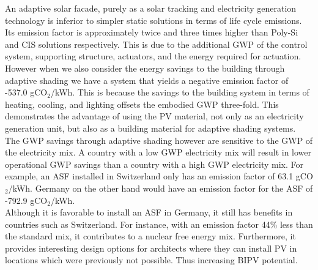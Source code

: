 
An adaptive solar facade, purely as a solar tracking and electricity generation technology is inferior to simpler static solutions in terms of life cycle emissions. Its emission factor is approximately twice and three times higher than Poly-Si and CIS solutions respectively. This is due to the additional GWP of the control system, supporting structure, actuators, and the energy required for actuation. \\

However when we also consider the energy savings to the building through adaptive shading we have a system that yields a negative emission factor of -537.0 gCO${_2}$/kWh. This is because the savings to the building system in terms of heating, cooling, and lighting offsets the embodied GWP three-fold. This demonstrates the advantage of using the PV material, not only as an electricity generation unit, but also as a building material for adaptive shading systems.\\


The GWP savings through adaptive shading however are sensitive to the GWP of the electricity mix. A country with a low GWP electricity mix will result in lower operational GWP savings than a country with a high GWP electricity mix. For example, an ASF installed in Switzerland only has an emission factor of 63.1 gCO${_2}$/kWh. Germany on the other hand would have an emission factor for the ASF of -792.9  gCO${_2}$/kWh.\\

Although it is favorable to install an ASF in Germany, it still has benefits in countries such as Switzerland. For instance, with an emission factor 44\% less than the standard mix, it contributes to a nuclear free energy mix. Furthermore, it provides interesting design options for architects where they can install PV in locations which were previously not possible. Thus increasing BIPV potential.  \\

